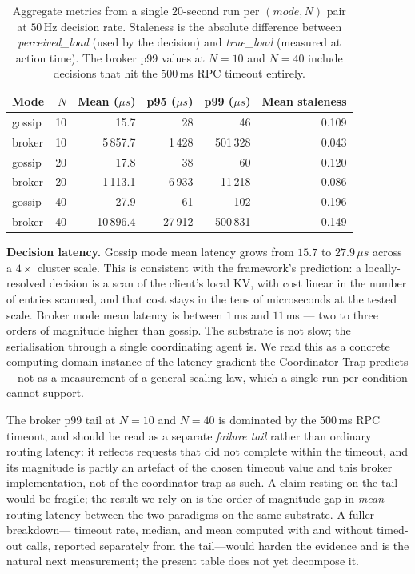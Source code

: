 \documentclass[11pt]{article}
\theoremstyle{definition}
\theoremstyle{plain}
\theoremstyle{plain}
\begin{document}
\begin{table}[!ht]
\centering
\small
\begin{tabular}{lrrrrr}
\toprule
\textbf{Mode} & \textbf{$N$} & \textbf{Mean ($\mu s$)} & \textbf{p95 ($\mu s$)} & \textbf{p99 ($\mu s$)} & \textbf{Mean staleness} \\
\midrule
gossip & 10 &     15.7 &    28 &     46 & 0.109 \\
broker & 10 &  5\,857.7 & 1\,428 & 501\,328 & 0.043 \\
gossip & 20 &     17.8 &    38 &     60 & 0.120 \\
broker & 20 &  1\,113.1 & 6\,933 &  11\,218 & 0.086 \\
gossip & 40 &     27.9 &    61 &    102 & 0.196 \\
broker & 40 & 10\,896.4 & 27\,912 & 500\,831 & 0.149 \\
\bottomrule
\end{tabular}
\caption{Aggregate metrics from a single $20$-second run per $(mode, N)$ pair
at $50$\,Hz decision rate. Staleness is the absolute difference between
\emph{perceived\_load} (used by the decision) and \emph{true\_load}
(measured at action time). The broker p99 values at $N{=}10$ and $N{=}40$
include decisions that hit the $500$\,ms RPC timeout entirely.}
\label{tab:empirical}
\end{table}

\textbf{Decision latency.} Gossip mode mean latency grows from $15.7$ to
$27.9$\,$\mu s$ across a $4\times$ cluster scale. This is consistent with
the framework's prediction: a locally-resolved decision is a scan of the
client's local KV, with cost linear in the number of entries scanned, and
that cost stays in the tens of microseconds at the tested scale. Broker
mode mean latency is between $1$\,ms and $11$\,ms — two to three orders
of magnitude higher than gossip. The substrate is not slow; the serialisation
through a single coordinating agent is. We read this as a concrete computing-domain
instance of the latency gradient the Coordinator Trap predicts---not as a measurement
of a general scaling law, which a single run per condition cannot support.

The broker p99 tail at $N{=}10$ and $N{=}40$ is dominated by the $500$\,ms RPC
timeout, and should be read as a separate \emph{failure tail} rather than ordinary
routing latency: it reflects requests that did not complete within the timeout, and
its magnitude is partly an artefact of the chosen timeout value and this broker
implementation, not of the coordinator trap as such. A claim resting on the tail
would be fragile; the result we rely on is the order-of-magnitude gap in \emph{mean}
routing latency between the two paradigms on the same substrate. A fuller breakdown---
timeout rate, median, and mean computed with and without timed-out calls, reported
separately from the tail---would harden the evidence and is the natural next
measurement; the present table does not yet decompose it.
\end{document}
